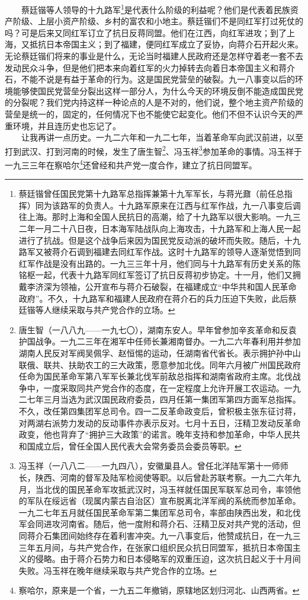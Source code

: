 \documentclass[cn,11pt,chinese]{elegantbook}
\begin{document}
　　蔡廷锴等人领导的十九路军\footnote[10]{ 蔡廷锴曾任国民党第十九路军总指挥兼第十九军军长，与蒋光鼐（前任总指挥）同为该路军的负责人。十九路军原来在江西与红军作战，九一八事变后调往上海。那时上海和全国人民抗日的高潮，给了十九路军以很大影响。一九三二年一月二十八日夜，日本海军陆战队向上海攻击，十九路军和上海人民一起进行了抗战。但是这个战争后来因为国民党反动派的破坏而失败。随后，十九路军又被蒋介石调到福建去同红军作战。这时十九路军的领导人逐渐觉悟到同红军作战是没有出路的。一九三三年十月，他们同与十九路军有历史关系的陈铭枢一起，代表十九路军同红军签订了抗日反蒋初步协定。十一月，他们又拥戴李济深为领袖，公开宣布与蒋介石破裂，在福建成立“中华共和国人民革命政府”。不久，十九路军和福建人民政府在蒋介石的兵力压迫下失败，此后蔡廷锴等人继续采取与共产党合作的立场。}是代表什么阶级的利益呢？他们是代表着民族资产阶级、上层小资产阶级、乡村的富农和小地主。蔡廷锴们不是同红军打过死仗的吗？可是后来又同红军订立了抗日反蒋同盟。他们在江西，向红军进攻；到了上海，又抵抗日本帝国主义；到了福建，便同红军成立了妥协，向蒋介石开起火来。无论蔡廷锴们将来的事业是什么，无论当时福建人民政府还是怎样守着老一套不去发动民众斗争，但是他们把本来向着红军的火力掉转去向着日本帝国主义和蒋介石，不能不说是有益于革命的行为。这是国民党营垒的破裂。九一八事变以后的环境能够使国民党营垒分裂出这样一部分人，为什么今天的环境反倒不能造成国民党的分裂呢？我们党内持这样一种论点的人是不对的，他们说，整个地主资产阶级的营垒是统一的，固定的，任何情况下也不能使它起变化。他们不但不认识今天的严重环境，并且连历史也忘记了。\\
　　让我再讲一点历史。一九二六年和一九二七年，当着革命军向武汉前进，以至打到武汉、打到河南的时候，发生了唐生智\footnote[11]{ 唐生智（一八八九——一九七〇），湖南东安人。早年曾参加辛亥革命和反袁护国战争。一九二三年在湘军中任师长兼湘南督办。一九二六年春利用并参加湖南人民反对军阀吴佩孚、赵恒惕的运动，任湖南省代省长。表示拥护孙中山联俄、联共、扶助农工的三大政策，愿意参加北伐。同年六月被广州国民政府任命为国民革命军第八军军长兼北伐军前敌总指挥和湖南省政府主席。北伐战争中，一度采取同共产党合作的态度，在一定程度上允许开展工农运动。一九二七年三月当选为武汉国民政府委员，四月任第一集团军第四方面军总指挥。不久，改任第四集团军总司令。四一二反革命政变后，曾积极主张东征讨蒋，对两湖右派势力发动的反动事件亦表示反对。七月十五日，汪精卫发动反革命政变，他也背弃了“拥护三大政策”的诺言。晚年支持和参加革命，中华人民共和国成立后，曾任全国人民代表大会常务委员会委员等职。}、冯玉祥\footnote[12]{ 冯玉祥（一八八二——一九四八），安徽巢县人。曾任北洋陆军第十一师师长，陕西、河南的督军及陆军检阅使等职。以后曾赴苏联考察。一九二六年九月，当北伐的国民革命军攻抵武汉时，冯玉祥就任国民军联军总司令，率领他的军队在绥远省（现属内蒙古自治区）宣布脱离北洋军阀的系统而参加革命。一九二七年五月就任国民革命军第二集团军总司令，率部由陕西出发，和北伐军会同进攻河南省。随后，他一度附和蒋介石、汪精卫反对共产党的活动，但同蒋介石集团间始终存在着利害冲突。九一八事变后，他赞成抗日，在一九三三年五月间，与共产党合作，在张家口组织民众抗日同盟军，抵抗日本帝国主义的侵略。由于蒋介石势力和日本侵略军的双重压迫，这次抗日起义于十月间失败。冯玉祥在晚年继续采取与共产党合作的立场。}参加革命的事情。冯玉祥于一九三三年在察哈尔\footnote[13]{ 察哈尔，原来是一个省，一九五二年撤销，原辖地区划归河北、山西两省。}还曾经和共产党一度合作，建立了抗日同盟军。\\
\end{document}
